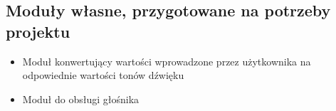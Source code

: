 \documentclass{article}
\begin{document}
\subsection{Moduły własne, przygotowane na potrzeby projektu}

\begin{itemize}
    \item Moduł konwertujący wartości wprowadzone przez użytkownika na odpowiednie wartości tonów dźwięku %
    \item Moduł do obsługi głośnika %
\end{itemize}
\end{document}
